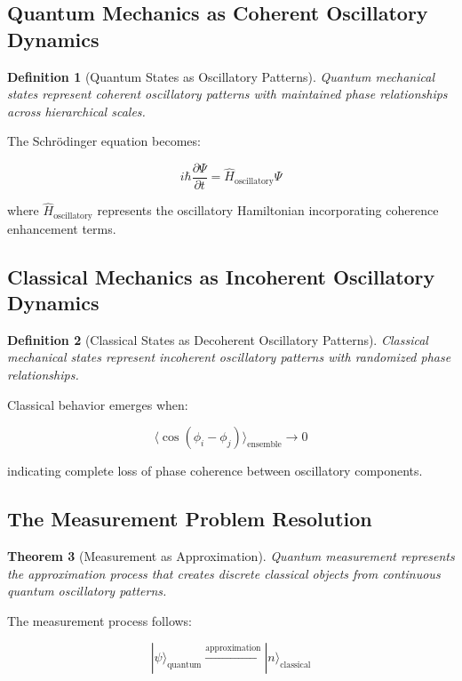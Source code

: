 \documentclass[11pt]{article}
\newtheorem{theorem}{Theorem}[section]
\newtheorem{definition}[theorem]{Definition}
\theoremstyle{remark}
\begin{document}
\subsection{Quantum Mechanics as Coherent Oscillatory Dynamics}

\begin{definition}[Quantum States as Oscillatory Patterns]
Quantum mechanical states represent coherent oscillatory patterns with maintained phase relationships across hierarchical scales.
\end{definition}

The Schrödinger equation becomes:

$$i\hbar \frac{\partial \Psi}{\partial t} = \hat{H}_{\text{oscillatory}} \Psi$$

where $\hat{H}_{\text{oscillatory}}$ represents the oscillatory Hamiltonian incorporating coherence enhancement terms.

\subsection{Classical Mechanics as Incoherent Oscillatory Dynamics}

\begin{definition}[Classical States as Decoherent Oscillatory Patterns]
Classical mechanical states represent incoherent oscillatory patterns with randomized phase relationships.
\end{definition}

Classical behavior emerges when:

$$\langle \cos(\phi_i - \phi_j) \rangle_{\text{ensemble}} \to 0$$

indicating complete loss of phase coherence between oscillatory components.

\subsection{The Measurement Problem Resolution}

\begin{theorem}[Measurement as Approximation]
Quantum measurement represents the approximation process that creates discrete classical objects from continuous quantum oscillatory patterns.
\end{theorem}

The measurement process follows:

$$|\psi\rangle_{\text{quantum}} \xrightarrow{\text{approximation}} |n\rangle_{\text{classical}}$$
\end{document}
